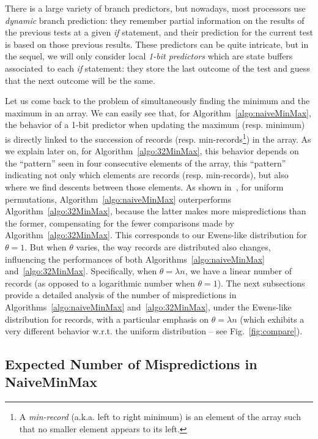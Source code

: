 \documentclass[proceedings]{aofa}
\begin{document}
There is a large variety of branch predictors, but nowadays, most processors use {\em dynamic} branch prediction: 
they remember partial information on the results of the previous tests at a given \emph{if} statement, 
and their prediction for the current test is based on those previous results.
These predictors can be quite intricate, but in the sequel, we will only consider local {\em 1-bit predictors} which are state buffers associated~to each \emph{if} statement: they store the last outcome of the test and guess that the next outcome will be the same. 

Let us come back to the problem of simultaneously finding the minimum and the maximum in an array. 
We can easily see that, for Algorithm~\ref{algo:naiveMinMax}, the behavior of a 1-bit predictor when updating the maximum (resp. minimum) 
is directly linked to the succession of records (resp. min-records\footnote{
A \emph{min-record} (a.k.a. left to right minimum) is an element of the array such that no smaller element appears to its left.}) 
in the array. 
As we explain later on, for Algorithm~\ref{algo:32MinMax}, this behavior depends on the ``pattern'' seen 
in four consecutive elements of the array, this ``pattern'' indicating not only which elements are records (resp. min-records), 
but also where we find descents between those elements. 
As shown in~\cite{AuNiPi16}, for uniform permutations, Algorithm~\ref{algo:naiveMinMax} outerperforms Algorithm~\ref{algo:32MinMax}, 
because the latter makes more mispredictions than the former, compensating for the fewer comparisons made by Algorithm~\ref{algo:32MinMax}. 
This corresponds to our Ewens-like distribution for $\theta=1$. 
But when $\theta$ varies, the way records are distributed also changes, influencing the performances of both Algorithms~\ref{algo:naiveMinMax} and~\ref{algo:32MinMax}. 
Specifically, when $\theta=\lambda n$, we have a linear number of records (as opposed to a logarithmic number when $\theta=1$). 
The next subsections provide a detailed analysis of the number of mispredictions in Algorithms~\ref{algo:naiveMinMax} and~\ref{algo:32MinMax}, 
under the Ewens-like distribution for records, with a particular emphasis on $\theta=\lambda n$
(which exhibits a very different behavior w.r.t. the uniform distribution -- see Fig.~\ref{fig:compare}). 


\subsection{Expected Number of Mispredictions in NaiveMinMax}\label{sec:naive}
\end{document}
